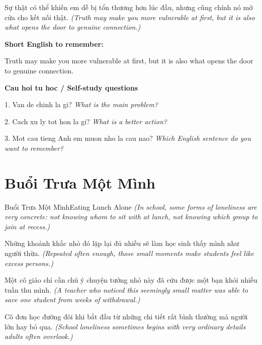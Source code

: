 \begin{baihoc}
Sự thật có thể khiến em dễ bị tổn thương hơn lúc đầu, nhưng cũng chính nó mở cửa cho kết nối thật.
\textit{(Truth may make you more vulnerable at first, but it is also what opens the door to genuine connection.)}
\end{baihoc}

\begin{ghinhoanh}
\textbf{Short English to remember:}

Truth may make you more vulnerable at first, but it is also what opens the door to genuine connection.

\end{ghinhoanh}

\begin{tuhocnhanh}
\textbf{Cau hoi tu hoc / Self-study questions}

1. Van de chinh la gi? \textit{What is the main problem?}

2. Cach xu ly tot hon la gi? \textit{What is a better action?}

3. Mot cau tieng Anh em muon nho la cau nao? \textit{Which English sentence do you want to remember?}
\end{tuhocnhanh}
\ngancach

\section{Buổi Trưa Một Mình}
\begin{truyen}{Buổi Trưa Một Mình}{Eating Lunch Alone}
\textit{(In school, some forms of loneliness are very concrete: not knowing whom to sit with at lunch, not knowing which group to join at recess.)}

Những khoảnh khắc nhỏ đó lặp lại đủ nhiều sẽ làm học sinh thấy mình như người thừa.
\textit{(Repeated often enough, those small moments make students feel like excess persons.)}

Một cô giáo chỉ cần chú ý chuyện tưởng nhỏ này đã cứu được một bạn khỏi nhiều tuần thu mình.
\textit{(A teacher who noticed this seemingly small matter was able to save one student from weeks of withdrawal.)}

Cô đơn học đường đôi khi bắt đầu từ những chi tiết rất bình thường mà người lớn hay bỏ qua.
\textit{(School loneliness sometimes begins with very ordinary details adults often overlook.)}

\end{truyen}

